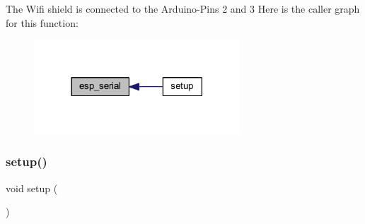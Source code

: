 The Wifi shield is connected to the Arduino-\/\+Pins 2 and 3 Here is the caller graph for this function\+:\nopagebreak
\begin{figure}[H]
\begin{center}
\leavevmode
\includegraphics[width=218pt]{_arduinopart_8ino_af690b3a6882292855c4091ede8039998_icgraph}
\end{center}
\end{figure}
\mbox{\label{_arduinopart_8ino_a4fc01d736fe50cf5b977f755b675f11d}} 
\subsubsection{\texorpdfstring{setup()}{setup()}}
{\footnotesize\ttfamily void setup (\begin{DoxyParamCaption}{ }\end{DoxyParamCaption})}


